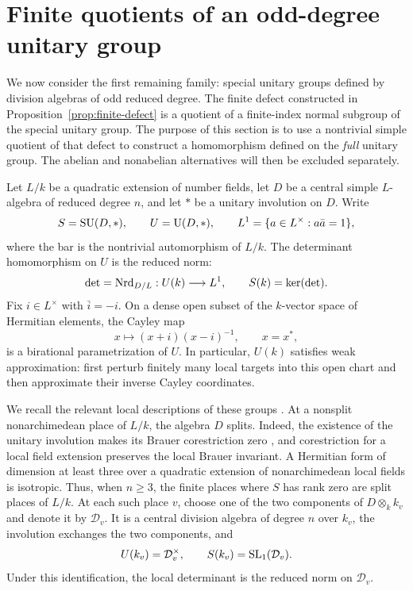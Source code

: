 \section{Finite quotients of an odd-degree unitary group}
\label{sec:colors}

We now consider the first remaining family: special unitary groups defined
by division algebras of odd reduced degree.  The finite defect constructed
in Proposition~\ref{prop:finite-defect} is a quotient of a finite-index
normal subgroup of the special unitary group.  The purpose of this section
is to use a nontrivial simple quotient of that defect to construct a
homomorphism defined on the \emph{full} unitary group.  The
abelian and nonabelian alternatives will then be excluded separately.

Let $L/k$ be a quadratic extension of number fields, let $D$ be a central
simple $L$-algebra of reduced degree $n$, and let $*$ be a unitary involution
on $D$.  Write
\[
 S=\operatorname{SU}(D,*),\qquad U=\operatorname{U}(D,*),\qquad
 L^1=\{a\in L^\times:a\bar a=1\},
\]
where the bar is the nontrivial automorphism of $L/k$.  The determinant
homomorphism on $U$ is the reduced norm:
\[
 \det=\operatorname{Nrd}_{D/L}:U(k)\longrightarrow L^1,
 \qquad S(k)=\ker(\det).
\]
Fix $i\in L^\times$ with $\bar i=-i$.  On a dense open subset of the
$k$-vector space of Hermitian elements, the Cayley map
\begin{equation}\label{eq:colors-cayley}
 x\longmapsto (x+i)(x-i)^{-1},\qquad x=x^*,
\end{equation}
is a birational parametrization of $U$.  In particular, $U(k)$ satisfies
weak approximation: first perturb finitely many local targets into this
open chart and then approximate their inverse Cayley coordinates.

We recall the relevant local descriptions of these groups
\cite{PRbook,Reiner,KMRT}.  At a nonsplit nonarchimedean place of $L/k$,
the algebra $D$ splits.  Indeed, the existence of the unitary involution
makes its Brauer corestriction zero
\cite[Theorem~3.1(2)]{KMRT}, and corestriction for a local field
extension preserves the local Brauer invariant.  A Hermitian form of
dimension at least three over a quadratic extension of nonarchimedean
local fields is isotropic.  Thus, when $n\geq3$, the finite places where
$S$ has rank zero are split places of $L/k$.  At each such place $v$,
choose one of the two components of $D\otimes_k k_v$ and denote it by
$\mathcal D_v$.  It is a central division algebra of degree $n$ over
$k_v$, the involution exchanges the two components, and
\begin{equation}\label{eq:colors-anisotropic-factors}
 U(k_v)=\mathcal D_v^\times,
 \qquad S(k_v)=\operatorname{SL}_1(\mathcal D_v).
\end{equation}
Under this identification, the local determinant is the reduced norm on
$\mathcal D_v$.

